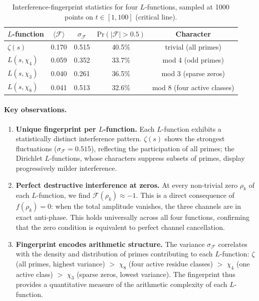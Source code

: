 \documentclass[aps,prx,reprint,floatfix]{revtex4-2}
\begin{document}
\begin{table}[htbp]
\centering
\footnotesize
\caption{Interference-fingerprint statistics for four $L$-functions,
sampled at 1000 points on $t\in[1,100]$ (critical line).}
\label{tab:fingerprints}
\begin{tabular}{lcccc}
\toprule
$L$-function & $\langle\mathcal{F}\rangle$ & $\sigma_\mathcal{F}$
  & $\mathrm{Pr}(|\mathcal{F}|>0.5)$ & Character \\
\midrule
$\zeta(s)$         & 0.170 & 0.515 & 40.5\% & trivial (all primes) \\
$L(s,\chi_4)$      & 0.059 & 0.352 & 33.7\% & mod 4 (odd primes) \\
$L(s,\chi_3)$      & 0.040 & 0.261 & 36.5\% & mod 3 (sparse zeros) \\
$L(s,\chi_8)$      & 0.041 & 0.513 & 32.6\% & mod 8 (four active classes) \\
\bottomrule
\end{tabular}
\end{table}

\paragraph{Key observations.}
\begin{enumerate}[leftmargin=1.4em]
\item \textbf{Unique fingerprint per $L$-function.}  Each $L$-function
exhibits a statistically distinct interference pattern.  $\zeta(s)$ shows
the strongest fluctuations ($\sigma_\mathcal{F}=0.515$), reflecting the
participation of all primes; the Dirichlet $L$-functions, whose characters
suppress subsets of primes, display progressively milder interference.

\item \textbf{Perfect destructive interference at zeros.}  At every
non-trivial zero $\rho_k$ of each $L$-function, we find
$\mathcal{F}(\rho_k)\approx -1$.  This is a direct consequence of
$f(\rho_k)=0$: when the total amplitude vanishes, the three channels are
in exact anti-phase.  This holds universally across all four functions,
confirming that the zero condition is equivalent to perfect channel
cancellation.

\item \textbf{Fingerprint encodes arithmetic structure.}  The variance
$\sigma_\mathcal{F}$ correlates with the density and distribution of primes
contributing to each $L$-function: $\zeta$ (all primes, highest variance)
$>$ $\chi_8$ (four active residue classes) $>$ $\chi_4$ (one active class)
$>$ $\chi_3$ (sparse zeros, lowest variance).  The fingerprint thus
provides a quantitative measure of the arithmetic complexity of each
$L$-function.
\end{enumerate}
\end{document}
